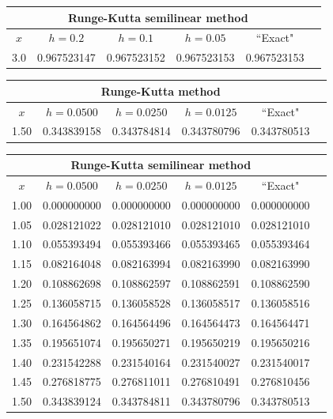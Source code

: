 \hspace{.75in}
{\small
\begin{tabular}{|c|r|r|r|r|r|}
\hline
\multicolumn{5}{|c|}{Runge-Kutta semilinear method}\\\hline
\multicolumn{1}{|c|}{$x$}&
\multicolumn{1}{|c|}{$h=0.2$}&
\multicolumn{1}{|c|}{$h=0.1$}&
\multicolumn{1}{|c|}{$h=0.05$}&
\multicolumn{1}{|c|}{``Exact"}\\ \hline
3.0 & 0.967523147 & 0.967523152 & 0.967523153 & 0.967523153 \\
\hline
\end{tabular}}\bigskip

\small{
\begin{tabular}{|c|r|r|r|r|r|}
\hline
\multicolumn{5}{|c|}{Runge-Kutta method}\\\hline
\multicolumn{1}{|c|}{$x$}&
\multicolumn{1}{|c|}{$h=0.0500$}&
\multicolumn{1}{|c|}{$h=0.0250$}&
\multicolumn{1}{|c|}{$h=0.0125$}&
\multicolumn{1}{|c|}{``Exact"}\\ \hline
1.50 &0.343839158  & 0.343784814 & 0.343780796 & 0.343780513 \\
\hline
\end{tabular}}\bigskip

\hspace{.75in}
{\small
\begin{tabular}{|c|r|r|r|r|r|}
\hline
\multicolumn{5}{|c|}{Runge-Kutta semilinear method}\\
\hline
\multicolumn{1}{|c|}{$x$}&
\multicolumn{1}{|c|}{$h=0.0500$}&
\multicolumn{1}{|c|}{$h=0.0250$}&
\multicolumn{1}{|c|}{$h=0.0125$}&
\multicolumn{1}{|c|}{``Exact"}\\ \hline
1.00 & 0.000000000 & 0.000000000 & 0.000000000 & 0.000000000 \\
1.05 & 0.028121022 & 0.028121010 & 0.028121010 & 0.028121010 \\
1.10 & 0.055393494 & 0.055393466 & 0.055393465 & 0.055393464 \\
1.15 & 0.082164048 & 0.082163994 & 0.082163990 & 0.082163990 \\
1.20 & 0.108862698 & 0.108862597 & 0.108862591 & 0.108862590 \\
1.25 & 0.136058715 & 0.136058528 & 0.136058517 & 0.136058516 \\
1.30 & 0.164564862 & 0.164564496 & 0.164564473 & 0.164564471 \\
1.35 & 0.195651074 & 0.195650271 & 0.195650219 & 0.195650216 \\
1.40 & 0.231542288 & 0.231540164 & 0.231540027 & 0.231540017 \\
1.45 & 0.276818775 & 0.276811011 & 0.276810491 & 0.276810456 \\
1.50 & 0.343839124 & 0.343784811 & 0.343780796 & 0.343780513 \\
\hline
\end{tabular}}\bigskip

